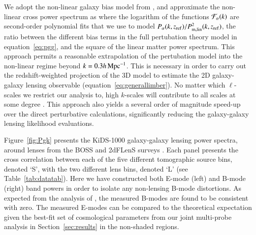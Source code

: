We adopt the non-linear galaxy bias model from \citet{sanchez/etal:2017}, and approximate the non-linear cross power spectrum as
where the logarithm of the functions ${\cal F}_\alpha(k)$ are second-order polynomial fits that we use to model $P_\alpha(k,z_{\rm ref})/P^2_{\rm m, lin}(k,z_{\rm ref})$, the ratio between the different bias terms in the full pertubation theory model in equation~\ref{eq:pgg}, and the square of the linear matter power spectrum.  This approach permits a reasonable extrapolation of the \citet{sanchez/etal:2017} pertubation model into the non-linear regime beyond $k = 0.3 h \,{\rm Mpc}^{-1}$.   This is necessary in order to carry out the redshift-weighted projection of the 3D model to estimate the 2D galaxy-galaxy lensing observable (equation~\ref{eq:generallimber}).  No matter which $\ell$-scales we restrict our analysis to, high $k$-scales will contribute to all scales at some degree \citep{joachimi/etal:inprep, asgari/etal:2020}.   This approach also yields a several order of magnitude speed-up over the direct perturbative calculations, significantly reducing the galaxy-galaxy lensing likelihood evaluations.  

Figure~\ref{fig:Pgk} presents the KiDS-1000 galaxy-galaxy lensing power spectra, around lenses from the BOSS and 2dFLenS surveys \citep[see][for the real-space KiDS-1000 galaxy-galaxy lensing measurements for BOSS and 2dFLenS separately]{blake/etal:2020}.   Each panel presents the cross correlation between each of the five different tomographic source bins, denoted `S', with the two different lens bins, denoted `L' (see Table~\ref{tab:datatab}).  Here we have constructed both E-mode (left) and B-mode (right) band powers in order to isolate any non-lensing B-mode distortions.     As expected from the analysis of \citet{giblin/etal:inprep}, the measured B-modes are found to be consistent with zero.   The measured E-modes can be compared to the theoretical expectation given the best-fit set of cosmological parameters from our joint multi-probe analysis in Section~\ref{sec:results} in the non-shaded regions.    

